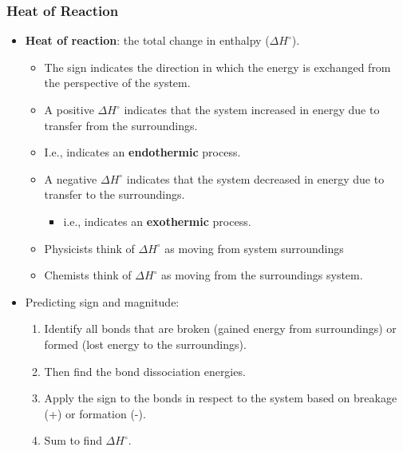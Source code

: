 \documentclass[12pt,a4paper]{article}
\begin{document}
\begin{itemize}
    \subsubsection{Heat of Reaction}
    \begin{itemize}
        \item \textbf{Heat of reaction}: the total change in enthalpy (\(\Delta H^\circ\)). 
            \begin{itemize}
                \item The sign indicates the direction in which the energy is exchanged from the {\color{o-Sun}perspective of the system}.
                \item A {\color{pos}positive \(\Delta H^\circ\)} indicates that the system {\color{pos}increased} in energy due to transfer {\color{pos}from the surroundings}.
                    \item I.e., indicates an {\color{pos}\textbf{endothermic}} process.
                \item A {\color{neg}negative \(\Delta H^\circ\)} indicates that the system {\color{neg}decreased} in energy due to transfer {\color{neg}to the surroundings}.
                    \begin{itemize}
                        \item i.e., indicates an {\color{neg}\textbf{exothermic}} process.
                    \end{itemize}
                \item Physicists think of \(\Delta H^\circ\) as moving from system \ch{->}surroundings
                \item Chemists think of \(\Delta H^\circ\) as moving from the surroundings \ch{->} system.
            \end{itemize}
        \item Predicting sign and magnitude:
            \begin{enumerate}
                \item Identify all bonds that are {\color{pos}broken (gained energy from surroundings)} or {\color{neg}formed (lost energy to the surroundings)}.
                \item Then find the bond dissociation energies.
                \item Apply the sign to the bonds in respect to the system based on {\color{pos}breakage (+)} or {\color{neg}formation (-)}.
                \item Sum to find \(\Delta H^\circ\).
            \end{enumerate}
    \end{itemize}
\end{itemize}
\end{document}
